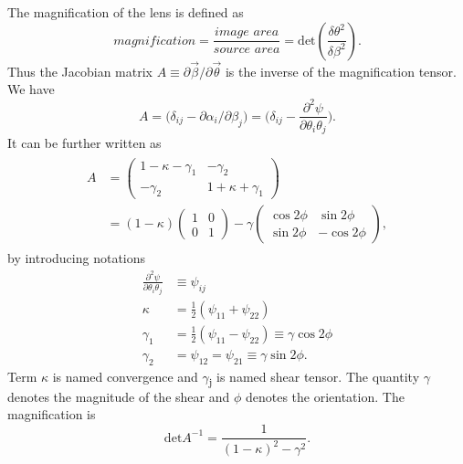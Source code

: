 \documentclass[letter,12pt]{article}
\begin{document}
The magnification of the lens is defined as
\begin{equation}
magnification = \frac{image\,\, area}{source\,\, area} = \mathrm{det}( \frac{\delta \theta^2} {{\delta \beta^2}} ).
\end{equation}
Thus the Jacobian matrix \(A\equiv\partial\vec{\beta}/\partial\vec{\theta}\)
is the inverse of the magnification tensor. We have
\begin{equation}
A = \bigg(\delta_{ij} - \partial{\alpha_i}/\partial \beta_j\bigg) = \bigg( \delta_{ij} - \frac{\partial^2\psi}{\partial\theta_i\theta_j} \bigg).
\end{equation}
It can be further written as
\begin{align}
\begin{split}
A &=
\begin{pmatrix}
1-\kappa-\gamma_1 & -\gamma_2 \\
-\gamma_2 & 1+\kappa+\gamma_1
\end{pmatrix}
\\
&=(1-\kappa)
\begin{pmatrix}
1 & 0\\0 & 1
\end{pmatrix}
-\gamma
\begin{pmatrix}
\cos{2\phi} & \sin{2\phi} \\
\sin{2\phi} & -\cos{2\phi}
\end{pmatrix},
\end{split}
\end{align}
by introducing notations
\begin{align}
\frac{\partial^2\psi}{\partial\theta_i\theta_j} &\equiv \psi_{ij} \\
\kappa &= \frac{1}{2}(\psi_{11}+\psi_{22}) \\
\gamma_1 &= \frac{1}{2}(\psi_{11}-\psi_{22})\equiv \gamma \cos{2\phi} \\
\gamma_2 &= \psi_{12} = \psi_{21} \equiv \gamma \sin{2\phi}.
\end{align}
Term \(\kappa\) is named convergence and \(\gamma\)\textsubscript{j} is named shear
tensor. The quantity \(\gamma\) denotes the magnitude of the shear and
\(\phi\) denotes the orientation. The magnification is
\begin{equation}
\mathrm{det}A^{-1} = \frac{1}{(1-\kappa)^2-\gamma^2}.
\end{equation}
\end{document}
